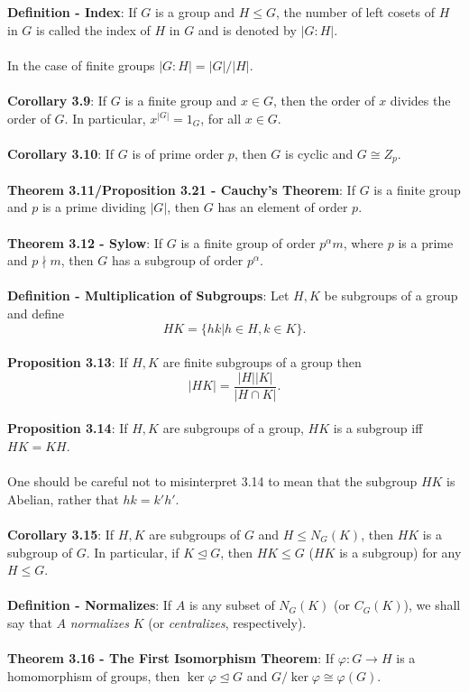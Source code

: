\documentclass{article}
\begin{document}
\textbf{Definition - Index}: If $G$ is a group and $H \leq G$, the number of left cosets of $H$ in $G$ is called the index of $H$ in $G$ and is denoted by $|G:H|$. \\ \\
In the case of finite groups $|G:H| = |G|/|H|$. \\ \\
\textbf{Corollary 3.9}: If $G$ is a finite group and $x \in G$, then the order of $x$ divides the order of $G$. In particular, $x^{|G|} = 1_G$, for all $x \in G$. \\ \\
\textbf{Corollary 3.10}: If $G$ is of prime order $p$, then $G$ is cyclic and $G \cong Z_p$. \\ \\
\textbf{Theorem 3.11/Proposition 3.21 - Cauchy's Theorem}: If $G$ is a finite group and $p$ is a prime dividing $|G|$, then $G$ has an element of order $p$. \\ \\
\textbf{Theorem 3.12 - Sylow}: If $G$ is a finite group of order $p^\alpha m$, where $p$ is a prime and $p \nmid m$, then $G$ has a subgroup of order $p^\alpha.$ \\ \\
\textbf{Definition - Multiplication of Subgroups}: Let $H, K$ be subgroups of a group and define $$HK = \{hk | h \in H, k \in K\}.$$ \\
\textbf{Proposition 3.13}: If $H, K$ are finite subgroups of a group then $$|HK| = \frac{|H||K|}{|H \cap K|}.$$ \\
\textbf{Proposition 3.14}: If $H, K$ are subgroups of a group, $HK$ is a subgroup iff $HK = KH$. \\ \\
One should be careful not to misinterpret 3.14 to mean that the subgroup $HK$ is Abelian, rather that $hk = k'h'$. \\ \\
\textbf{Corollary 3.15}: If $H, K$ are subgroups of $G$ and $H \leq N_G(K)$, then $HK$ is a subgroup of $G$. In particular, if $K \trianglelefteq G$, then $HK \leq G$ ($HK$ is a subgroup) for any $H \leq G$. \\ \\
\textbf{Definition - Normalizes}: If $A$ is any subset of $N_G(K)$ (or $C_G(K)$), we shall say that $A$ \textit{normalizes} $K$ (or \textit{centralizes}, respectively). \\ \\
\textbf{Theorem 3.16 - The First Isomorphism Theorem}: If $\varphi : G \rightarrow H$ is a homomorphism of groups, then $\ker{\varphi} \trianglelefteq G$ and $G/\ker{\varphi} \cong \varphi(G)$. \\ \\
\end{document}
